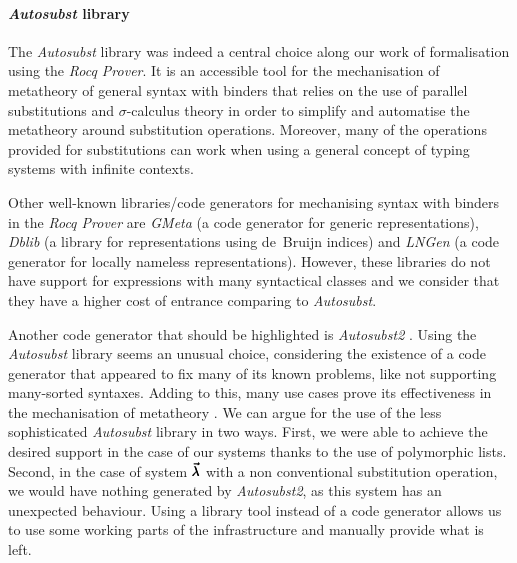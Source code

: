\paragraph{\textit{Autosubst} library}
The \textit{Autosubst} library \cite{AutosubstSchafer} was indeed a central choice along our work of formalisation using the \textit{Rocq Prover}.
It is an accessible tool for the mechanisation of metatheory of general syntax with binders that relies on the use of parallel substitutions and $\sigma$-calculus theory in order to simplify and automatise the metatheory around substitution operations.
Moreover, many of the operations provided for substitutions can work when using a general concept of typing systems with infinite contexts.

Other well-known libraries/code generators for mechanising syntax with binders in the \textit{Rocq Prover} are \textit{GMeta} \cite{GMeta} (a code generator for generic representations), \textit{Dblib} \cite{Dblib} (a library for representations using de~Bruijn indices) and \textit{LNGen} \cite{LNGen} (a code generator for locally nameless representations).
However, these libraries do not have support for expressions with many syntactical classes and we consider that they have a higher cost of entrance comparing to \textit{Autosubst}.

Another code generator that should be highlighted is \textit{Autosubst2} \cite{Autosubst2}.
Using the \textit{Autosubst} library seems an unusual choice, considering the existence of a code generator that appeared to fix many of its known problems, like not supporting many-sorted syntaxes.
Adding to this, many use cases prove its effectiveness in the mechanisation of metatheory \cite{Forster2019,Dudenhefner2024}.
We can argue for the use of the less sophisticated \textit{Autosubst} library in two ways.
First, we were able to achieve the desired support in the case of our systems thanks to the use of polymorphic lists.
Second, in the case of system $\pmb{\vec \lambda}$ with a non conventional substitution operation, we would have nothing generated by \textit{Autosubst2}, as this system has an unexpected behaviour.
Using a library tool instead of a code generator allows us to use some working parts of the infrastructure and manually provide what is left.

